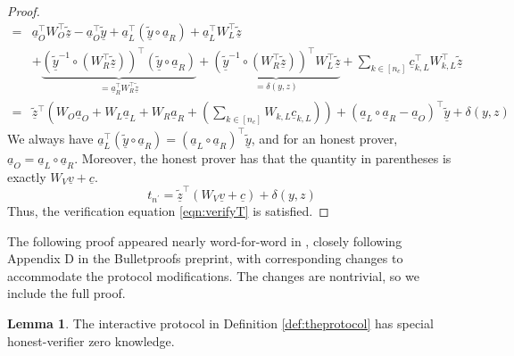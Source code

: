 \documentclass{article}
\theoremstyle{definition}
\newtheorem{lemma}[theorem]{Lemma}
\newcommand{\zq}{\widetilde{\underline{z}}}
\newcommand{\yq}{\widetilde{\underline{y}}}
\begin{document}
\begin{proof}
\begin{align*}
=& \underline{a}_O^\top W_O^\top \zq - \underline{a}_O^\top \yq + \underline{a}_L^\top(\yq \circ \underline{a}_R) + \underline{a}_L^\top W_L^\top \zq \\
& + \underbrace{\left(\yq^{-1}\circ\left(W_R^\top \zq\right)\right)^\top(\yq \circ \underline{a}_R)}_{= \underline{a}_R^\top W_R^\top \zq} + \underbrace{\left(\yq^{-1}\circ \left(W_R^\top \zq\right)\right)^\top W_L^\top \zq}_{=\delta(y,z)} + \sum_{k \in [n_c]} \underline{c}_{k,L}^\top W^\top_{k,L} \zq\\
=& \zq\!^\top\!\left(\!W_O\underline{a}_O\!+\!W_L\underline{a}_L\!+\!W_R\underline{a}_R\!+\!\left(\!\sum_{k \in [n_c]}\!W_{k,L}\underline{c}_{k,L}\!\right)\!\right)\! + \!(\underline{a}_L\!\circ\!\underline{a}_R\!-\!\underline{a}_O\!)^\top\!\yq\!+\!\delta(y,z)\end{align*}
We always have $\underline{a}_L^\top(\yq \circ \underline{a}_R) = (\underline{a}_L \circ \underline{a}_R)^\top \yq$, and for an honest prover, $\underline{a}_O = \underline{a}_L \circ \underline{a}_R$. Moreover, the honest prover has that the quantity in parentheses is exactly $W_V \underline{v} + \underline{c}$. 
$$t_{n^\prime} = \zq^\top(W_V\underline{v} + \underline{c}) + \delta(y,z)$$
Thus, the verification equation \ref{eqn:verifyT} is satisfied.
\end{proof}

The following proof appeared nearly word-for-word in \cite{aaron}, closely following Appendix D in the Bulletproofs preprint, with corresponding changes to accommodate the protocol modifications.
The changes are nontrivial, so we include the full proof.

\begin{lemma}
The interactive protocol in Definition \ref{def:theprotocol} has special honest-verifier zero knowledge.
\end{lemma}
\end{document}
